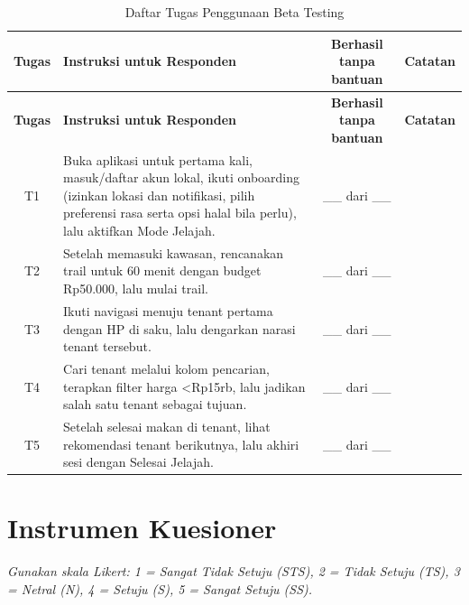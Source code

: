 \begin{longtable}{|C{0.08}|L{0.50}|C{0.20}|L{0.22}|}
\caption{Daftar Tugas Penggunaan Beta Testing}\\
\hline
{}\textbf{Tugas} & \textbf{Instruksi untuk Responden} & \textbf{Berhasil tanpa bantuan} & \textbf{Catatan} \\ \hline
\endfirsthead
\hline
{}\textbf{Tugas} & \textbf{Instruksi untuk Responden} & \textbf{Berhasil tanpa bantuan} & \textbf{Catatan} \\ \hline
\endhead
T1 & Buka aplikasi untuk pertama kali, masuk/daftar akun lokal, ikuti onboarding (izinkan lokasi dan notifikasi, pilih preferensi rasa serta opsi halal bila perlu), lalu aktifkan Mode Jelajah. & \_\_ dari \_\_ & \\ \hline
T2 & Setelah memasuki kawasan, rencanakan trail untuk 60 menit dengan budget Rp50.000, lalu mulai trail. & \_\_ dari \_\_ & \\ \hline
T3 & Ikuti navigasi menuju tenant pertama dengan HP di saku, lalu dengarkan narasi tenant tersebut. & \_\_ dari \_\_ & \\ \hline
T4 & Cari tenant melalui kolom pencarian, terapkan filter harga <Rp15rb, lalu jadikan salah satu tenant sebagai tujuan. & \_\_ dari \_\_ & \\ \hline
T5 & Setelah selesai makan di tenant, lihat rekomendasi tenant berikutnya, lalu akhiri sesi dengan Selesai Jelajah. & \_\_ dari \_\_ & \\ \hline
\end{longtable}

\section{Instrumen Kuesioner}

\textit{Gunakan skala Likert: 1 = Sangat Tidak Setuju (STS), 2 = Tidak Setuju (TS), 3 = Netral (N), 4 = Setuju (S), 5 = Sangat Setuju (SS).}

